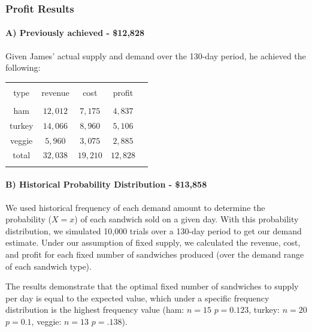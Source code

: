 \documentclass[]{article}
\begin{document}
\subsubsection{Profit Results}\label{profit-results}

\paragraph{A) Previously achieved -
\$12,828}\label{a-previously-achieved---12828}

Given James' actual supply and demand over the 130-day period, he
achieved the following:

\begin{table}[!htbp]
  \label{} 
\begin{tabular}{@{\extracolsep{5pt}} ccccc} 
\\[-1.8ex]\hline 
\hline \\[-1.8ex] 
type & revenue & cost & profit \\ 
\hline \\[-1.8ex] 
ham & $12,012$ & $7,175$ & $4,837$ \\ 
turkey & $14,066$ & $8,960$ & $5,106$ \\ 
veggie & $5,960$ & $3,075$ & $2,885$ \\ 
total & $32,038$ & $19,210$ & $12,828$ \\ 
\hline \\[-1.8ex] 
\end{tabular} 
\end{table}

\paragraph{B) Historical Probability Distribution -
\$13,858}\label{b-historical-probability-distribution---13858}

We used historical frequency of each demand amount to determine the
probability ($X=x$) of each sandwich sold on a given day. With this
probability distribution, we simulated 10,000 trials over a 130-day
period to get our demand estimate. Under our assumption of fixed supply,
we calculated the revenue, cost, and profit for each fixed number of
sandwiches produced (over the demand range of each sandwich type).

The results demonstrate that the optimal fixed number of sandwiches to
supply per day is equal to the expected value, which under a specific
frequency distribution is the highest frequency value (ham: $n=15$
$p=0.123$, turkey: $n=20$ $p=0.1$, veggie: $n=13$ $p=.138$).
\end{document}
